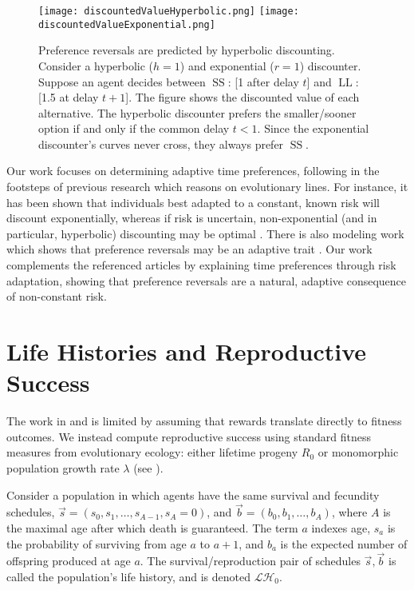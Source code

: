 \documentclass[titlepage, hidelinks, 12pt]{article}
\theoremstyle{plain}
\theoremstyle{remark}
\theoremstyle{definition}
\newcommand{\LH}{\mathcal{LH}}
\DeclareMathOperator{\smallersooner}{SS}
\DeclareMathOperator{\largerlater}{LL}
\begin{document}
\begin{figure}[H]
    \centering
    \texttt{[image: discountedValueHyperbolic.png]}
    \texttt{[image: discountedValueExponential.png]}
    \caption[Graphical depiction of a preference reversal.]{Preference reversals are predicted by hyperbolic discounting. Consider a hyperbolic ($h = 1$) and exponential ($r = 1$) discounter. 
       Suppose an agent
    decides between $\smallersooner$: [1 after delay $t$] and $\largerlater$: [1.5 at delay $t+1$]. The figure shows the discounted value
    of each alternative. The hyperbolic discounter prefers the smaller/sooner option if and only if the common delay $t < 1$. 
    Since the exponential discounter's curves never cross, they always prefer $\smallersooner$. }
\end{figure}

Our work focuses on determining adaptive time preferences, following in the footsteps of previous research which reasons on evolutionary
lines. For instance, it has been shown that individuals best adapted
to a constant, known risk will discount exponentially, whereas if risk is uncertain, non-exponential (and in particular,
hyperbolic) discounting may be optimal \cite{sozou98}. 
There is also modeling work which shows that preference reversals may be an adaptive trait \cite{fawcett12}. 
Our work complements the referenced articles by explaining time preferences through risk adaptation, showing that preference reversals
are a natural, adaptive consequence of non-constant risk. 

\section{Life Histories and Reproductive Success}

The work in \cite{sozou98} and \cite{fawcett12} is limited by assuming that rewards translate directly to fitness outcomes. We instead
compute reproductive success
using standard fitness measures from evolutionary ecology: either lifetime progeny $R_0$ or monomorphic population growth rate $\lambda$ 
(see \cite{stearns92}).

Consider a population in which agents have the same survival and fecundity
schedules, $\vec{s} = (s_0, s_1, \ldots, s_{A-1}, s_A = 0)$, and $\vec{b} = (b_0, b_1, \ldots, b_A)$, where $A$ is the maximal age after
which death is guaranteed. The term $a$ indexes age, $s_a$ is the probability of surviving from age $a$ to $a+1$, and $b_a$ is the expected
number of offspring produced at age $a$. 
The survival/reproduction pair of schedules $\vec{s}, \vec{b}$
is called the population's life history, and is denoted $\LH_0$. 
\end{document}
